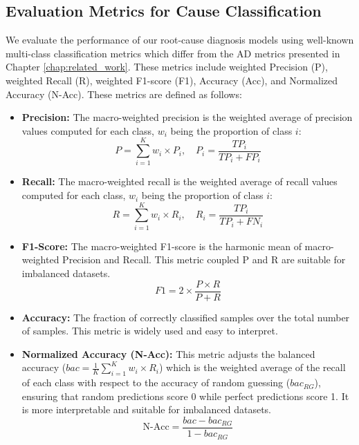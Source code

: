 \subsection{Evaluation Metrics for Cause Classification}
We evaluate the performance of our root-cause diagnosis models using well-known multi-class classification metrics which differ from the AD metrics presented in Chapter \ref{chap:related_work}. These metrics include weighted Precision (P), weighted Recall (R), weighted F1-score (F1), Accuracy (Acc), and Normalized Accuracy (N-Acc). These metrics are defined as follows:
\begin{itemize}
    \item \textbf{Precision:} The macro-weighted precision is the weighted average of precision values computed for each class, $w_i$ being the proportion of class $i$:
        \begin{equation}\label{w-precision}
            P = \sum_{i=1}^{K} w_i \times P_i, \quad P_i = \frac{TP_i}{TP_i + FP_i}
        \end{equation}
    \item \textbf{Recall:} The macro-weighted recall is the weighted average of recall values computed for each class, $w_i$ being the proportion of class $i$:
        \begin{equation}\label{w-recall}
            R = \sum_{i=1}^{K} w_i \times R_i, \quad R_i = \frac{TP_i}{TP_i + FN_i}
        \end{equation}
    \item \textbf{F1-Score:} The macro-weighted F1-score is the harmonic mean of macro-weighted Precision and Recall. This metric coupled P and R are suitable for imbalanced datasets.
        \begin{equation}\label{w-f1}
            F1 = 2 \times \frac{P \times R}{P + R}
        \end{equation}
    \item \textbf{Accuracy:} The fraction of correctly classified samples over the total number of samples. This metric is widely used and easy to interpret.
    \item \textbf{Normalized Accuracy (N-Acc):} This metric adjusts the balanced accuracy ($bac = \frac{1}{K} \sum_{i=1}^{K} w_i \times R_i$)  which is the weighted average of the recall of each class with respect to the accuracy of random guessing ($bac_{RG}$), ensuring that random predictions score 0 while perfect predictions score 1. It is more interpretable and suitable for imbalanced datasets.
        \begin{equation}\label{n-acc}
            \text{N-Acc} = \frac{bac - bac_{RG}}{1 - bac_{RG}}
        \end{equation}
\end{itemize}

